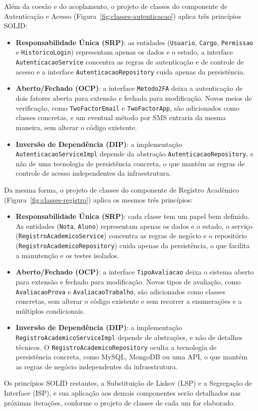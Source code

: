 Além da coesão e do acoplamento, o projeto de classes do componente de
Autenticação e Acesso (Figura~\ref{fig:classes-autenticacao}) aplica três
princípios SOLID:
\begin{itemize}[nosep]
    \item \textbf{Responsabilidade Única (SRP)}: as entidades
    (\texttt{Usuario}, \texttt{Cargo}, \texttt{Permissao} e
    \texttt{HistoricoLogin}) representam apenas os dados e o estado, a interface
    \texttt{AutenticacaoService} concentra as regras de autenticação e de
    controle de acesso e a interface \texttt{Autenticacao\allowbreak Repository}
    cuida apenas da persistência.
    \item \textbf{Aberto/Fechado (OCP)}: a interface \texttt{Metodo2FA} deixa a
    autenticação de dois fatores aberta para extensão e fechada para
    modificação. Novos meios de verificação, como \texttt{TwoFactorEmail} e
    \texttt{TwoFactorApp}, são adicionados como classes concretas, e um
    eventual método por SMS entraria da mesma maneira, sem alterar o código
    existente.
    \item \textbf{Inversão de Dependência (DIP)}: a implementação
    \texttt{AutenticacaoServiceImpl} depende da abstração
    \texttt{Autenticacao\allowbreak Repository}, e não de uma tecnologia de
    persistência concreta, o que mantém as regras de controle de acesso
    independentes da infraestrutura.
\end{itemize}
Da mesma forma, o projeto de classes do componente de Registro Acadêmico
(Figura~\ref{fig:classes-registro}) aplica os mesmos três princípios:
\begin{itemize}[nosep]
    \item \textbf{Responsabilidade Única (SRP)}: cada classe tem um papel bem
    definido. As entidades (\texttt{Nota}, \texttt{Aluno}) representam apenas
    os dados e o estado, o serviço (\texttt{RegistroAcademicoService})
    concentra as regras de negócio e o repositório
    (\texttt{RegistroAcademicoRepository}) cuida apenas da persistência, o que
    facilita a manutenção e os testes isolados.
    \item \textbf{Aberto/Fechado (OCP)}: a interface \texttt{TipoAvaliacao}
    deixa o sistema aberto para extensão e fechado para modificação. Novos
    tipos de avaliação, como \texttt{AvaliacaoProva} e
    \texttt{AvaliacaoTrabalho}, são adicionados como classes concretas, sem
    alterar o código existente e sem recorrer a enumerações e a múltiplos
    condicionais.
    \item \textbf{Inversão de Dependência (DIP)}: a implementação
    \texttt{RegistroAcademicoServiceImpl} depende de abstrações, e não de
    detalhes técnicos. O \texttt{RegistroAcademicoRepository} oculta a
    tecnologia de persistência concreta, como MySQL, MongoDB ou uma API, o que
    mantém as regras de negócio independentes da infraestrutura.
\end{itemize}
Os princípios SOLID restantes, a Substituição de Liskov (LSP) e a Segregação
de Interface (ISP), e sua aplicação aos demais componentes serão detalhados
nas próximas iterações, conforme o projeto de classes de cada um for
elaborado.

